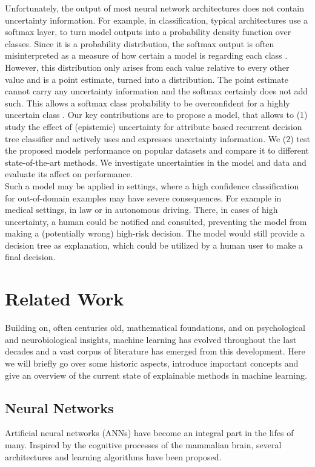 \documentclass[a4paper,cleardoubleempty,BCOR1cm, 11pt]{report}
\begin{document}
Unfortunately, the output of most neural network architectures does not contain uncertainty information. For example, in classification, typical architectures use a softmax layer, to turn model outputs into a probability density function \cite{nwankpa2018activation} over classes. Since it is a probability distribution, the softmax output is often misinterpreted as a measure of how certain a model is regarding each class \cite{sensoy2018evidential}. However, this distribution only arises from each value relative to every other value and is a point estimate, turned into a distribution. The point estimate cannot carry any uncertainty information and the softmax certainly does not add such. This allows a softmax class probability to be overconfident for a highly uncertain class \cite{gal2016dropout}.
Our key contributions are to propose a model, that allows to (1) study the effect of (epistemic) uncertainty for attribute based recurrent decision tree classifier and actively uses and expresses uncertainty information. We (2) test the proposed models performance on popular datasets and compare it to different state-of-the-art methods. We investigate uncertainties in the model and data and evaluate its affect on performance. \\
Such a model may be applied in settings, where a high confidence classification for out-of-domain examples may have severe consequences. For example in medical settings, in law or in autonomous driving. There, in cases of high uncertainty, a human could be notified and consulted, preventing the model from making a (potentially wrong) high-risk decision. The model would still provide a decision tree as explanation, which could be utilized by a human user to make a final decision.




\chapter{Related Work}
Building on, often centuries old, mathematical foundations, and on psychological and neurobiological insights, machine learning has evolved throughout the last decades and a vast corpus of literature has emerged from this development. Here we will briefly go over some historic aspects, introduce important concepts and give an overview of the current state of explainable methods in machine learning.


\section{Neural Networks}
Artificial neural networks (ANNs) have become an integral part in the lifes of many. Inspired by the cognitive processes of the mammalian brain, several architectures and learning algorithms have been proposed.
\end{document}
